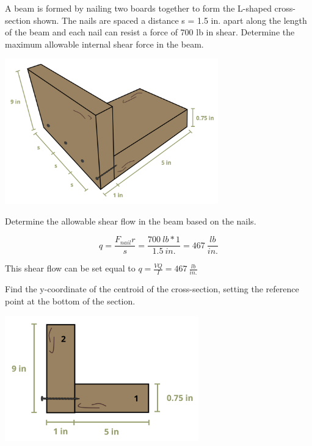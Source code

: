 \documentclass[
  letterpaper,
  DIV=11,
  numbers=noendperiod]{scrreprt}
\theoremstyle{definition}
\theoremstyle{remark}
\begin{document}
\begin{tcolorbox}[enhanced jigsaw, leftrule=.75mm, colbacktitle=quarto-callout-note-color!10!white, breakable, opacityback=0, colback=white, titlerule=0mm, toprule=.15mm, colframe=quarto-callout-note-color-frame, coltitle=black, title={Example 10.6}, toptitle=1mm, bottomrule=.15mm, rightrule=.15mm, left=2mm, arc=.35mm, opacitybacktitle=0.6, bottomtitle=1mm]

A beam is formed by nailing two boards together to form the L-shaped
cross-section shown. The nails are spaced a distance s = 1.5 in. apart
along the length of the beam and each nail can resist a force of 700 lb
in shear. Determine the maximum allowable internal shear force in the
beam.

\begin{center}
\includegraphics[width=3.63542in,height=\textheight]{images/CH10 PNGs/example 10.6 part 1.png}
\end{center}

\begin{tcolorbox}[enhanced jigsaw, leftrule=.75mm, colbacktitle=quarto-callout-note-color!10!white, breakable, opacityback=0, colback=white, titlerule=0mm, toprule=.15mm, colframe=quarto-callout-note-color-frame, coltitle=black, title={Solution}, toptitle=1mm, bottomrule=.15mm, rightrule=.15mm, left=2mm, arc=.35mm, opacitybacktitle=0.6, bottomtitle=1mm]

Determine the allowable shear flow in the beam based on the nails.

\[
q=\frac{F_{nail} r}{s}=\frac{700{~lb} * 1}{1.5{~in.}}=467~\frac{lb}{in.}
\]

This shear flow can be set equal to
\(q=\frac{V Q}{I}=467~\frac{lb}{in.}\)

Find the y-coordinate of the centroid of the cross-section, setting the
reference point at the bottom of the section.

\begin{center}
\includegraphics[width=3.30208in,height=\textheight]{images/CH10 PNGs/example 10.6 part 2.png}
\end{center}


\end{tcolorbox}
\end{tcolorbox}
\end{document}

